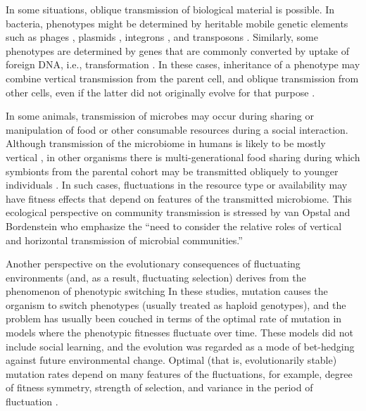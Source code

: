 \documentclass[9pt,twocolumn,twoside,lineno]{pnas-new}
\begin{document}
In some situations, oblique transmission of biological material is possible. In bacteria, phenotypes might be determined by heritable mobile genetic elements such as phages \cite{zinder1952genetic}, plasmids \cite{lederberg1946gene}, integrons \cite{mazel2006integrons}, and transposons \cite{salyers2004conjugative}. Similarly, some phenotypes are determined by genes that are commonly converted by uptake of foreign DNA, i.e., transformation \cite{milkman1990molecular}. In these cases, inheritance of a phenotype may combine vertical transmission from the parent cell, and oblique transmission from other cells, even if the latter did not originally evolve for that purpose \cite{redfield1993evolution}. 

In some animals, transmission of microbes may occur during sharing or manipulation of food or other consumable resources during a social interaction. Although transmission of the microbiome in humans is likely to be mostly vertical \cite{rosenberg2016microbes}, in other organisms there is multi-generational food sharing during which symbionts from the parental cohort may be transmitted obliquely to younger individuals \cite{theis2016getting}. In such cases, fluctuations in the resource type or availability may have fitness effects that depend on features of the transmitted microbiome. This ecological perspective on community transmission is stressed by van Opstal and Bordenstein \cite{van2015rethinking} who emphasize the ``need to consider the relative roles of vertical and horizontal transmission of microbial communities.''

Another perspective on the evolutionary consequences of fluctuating environments (and, as a result, fluctuating selection) derives from the phenomenon of phenotypic switching \cite{balaban2004bacterial,kussell2005phenotypic,thattai2004stochastic,salathe2009evolution,liberman2011evolution,gaal2010exact}
In these studies, mutation causes the organism to switch phenotypes (usually treated as haploid genotypes), and the problem has usually been couched in terms of the optimal rate of mutation in models where the phenotypic fitnesses fluctuate over time. These models did not include social learning, and the evolution was regarded as a mode of bet-hedging against future environmental change. Optimal (that is, evolutionarily stable) mutation rates depend on many features of the fluctuations, for example,  degree of fitness symmetry, strength of selection, and variance in the period of fluctuation \cite{salathe2009evolution}.
\end{document}
